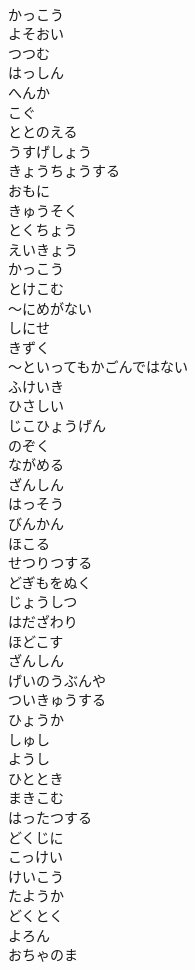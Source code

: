 \documentclass[8pt]{extreport}
\begin{document}
\begin{CJK}{UTF8}{min}
\\	かっこう
\\	よそおい
\\	つつむ
\\	はっしん
\\	へんか
\\	こぐ
\\	ととのえる
\\	うすげしょう
\\	きょうちょうする
\\	おもに
\\	きゅうそく
\\	とくちょう
\\	えいきょう
\\	かっこう
\\	とけこむ
\\	～にめがない
\\	しにせ
\\	きずく
\\	～といってもかごんではない
\\	ふけいき
\\	ひさしい
\\	じこひょうげん
\\	のぞく
\\	ながめる
\\	ざんしん
\\	はっそう
\\	びんかん
\\	ほこる
\\	せつりつする
\\	どぎもをぬく
\\	じょうしつ
\\	はだざわり
\\	ほどこす
\\	ざんしん
\\	げいのうぶんや
\\	ついきゅうする
\\	ひょうか
\\	しゅし
\\	ようし
\\	ひととき
\\	まきこむ
\\	はったつする
\\	どくじに
\\	こっけい
\\	けいこう
\\	たようか
\\	どくとく
\\	よろん
\\	おちゃのま

\end{CJK}
\end{document}
